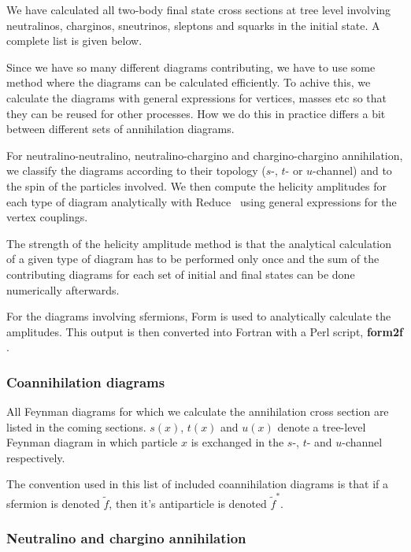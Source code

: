 \documentclass[a4paper,10pt,oneside]{book}
\newcommand{\codeb}[1]{\ftb{#1}}
\newcommand{\ftb}[1]{{\bfseries \sffamily #1}}
\begin{document}
We have calculated all two-body final state cross sections at tree
level  involving neutralinos, charginos, sneutrinos, sleptons and 
squarks in the initial state. A complete list is given below.

Since we have so many different diagrams contributing, we have to use 
some method where the diagrams can be calculated efficiently. To
achive this, we calculate the diagrams with general expressions for
vertices, masses etc so that they can be reused for other
processes. How we do this in practice differs a bit between different
sets of annihilation diagrams.

For neutralino-neutralino, neutralino-chargino and chargino-chargino
annihilation, we 
classify the diagrams according to their topology ($s$-, 
$t$- or $u$-channel) and to the spin of the particles involved.  We 
then compute the helicity amplitudes for each type of diagram 
analytically with {\sc Reduce}~\cite{reduce} using general expressions 
for the vertex couplings.  

The strength of the helicity amplitude method is that the analytical
calculation of a given type of diagram has to be performed only once
and the sum of the contributing diagrams for each set of initial and
final states can be done numerically afterwards.

For the diagrams involving sfermions, {\sc Form}
is used to analytically calculate the amplitudes. This output is then converted
into Fortran with a {\sc Perl} script, \codeb{form2f} \cite{form2f}.

\subsubsection{Coannihilation diagrams}

All Feynman diagrams for which we calculate the 
annihilation cross section are listed in the coming sections.
$s(x)$, $t(x)$ and $u(x)$ denote a
tree-level Feynman diagram in which particle $x$ is exchanged in
the $s$-, $t$- and $u$-channel respectively. 

The convention used in this list of included coannihilation diagrams is that if a sfermion is
denoted $\tilde{f}$, then it's antiparticle is denoted $\tilde{f}^*$.

\subsubsection{Neutralino and chargino annihilation}
\end{document}
